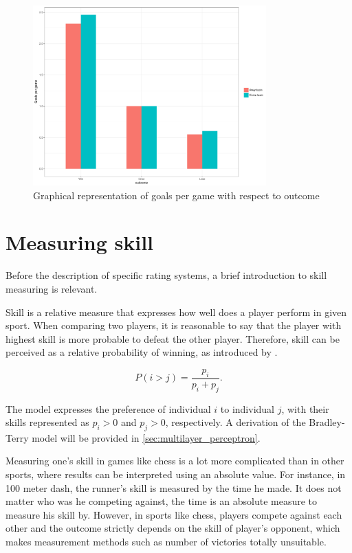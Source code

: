 \begin{figure}[H]
\caption{Graphical representation of goals per game with respect to outcome}
\centering
\includegraphics[width=0.8\textwidth]{figs/goals_per_game}
\end{figure}

\section{Measuring skill}
Before the description of specific rating systems, a brief introduction to skill measuring is relevant.

Skill is a relative measure that expresses how well does a player perform in given sport. When comparing two players, it is reasonable to say that the player with highest skill is more probable to defeat the other player. Therefore, skill can be perceived as a relative probability of winning, as introduced by \citet{BradleyRankAnalysisIncomplete1952}.

\begin{equation*}
P(i > j) = \frac{p_i}{p_i + p_j}.
\label{eq:bradley_terry}
\end{equation*}

The model expresses the preference of individual $i$ to individual $j$, with their skills represented as $p_i > 0$ and $p_j > 0$, respectively. A derivation of the Bradley-Terry model will be provided in \ref{sec:multilayer_perceptron}.

Measuring one's skill in games like chess is a lot more complicated than in other sports, where results can be interpreted using an absolute value. For instance, in 100 meter dash, the runner's skill is measured by the time he made. It does not matter who was he competing against, the time is an absolute measure to measure his skill by. However, in sports like chess, players compete against each other and the outcome strictly depends on the skill of player's opponent, which makes measurement methods such as number of victories totally unsuitable.

